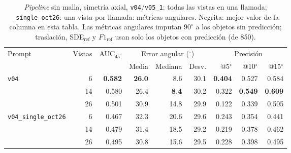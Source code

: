 
\begin{table}[htbp]
\centering
\caption{\textit{Pipeline} sin malla, simetría axial, \texttt{v04}/\texttt{v05\_1}: todas las vistas en una llamada; \texttt{\_single\_oct26}: una vista por llamada: métricas angulares. Negrita: mejor valor de la columna en esta tabla. Las métricas angulares imputan $90^\circ$ a los objetos sin predicción; traslación, SDE$_{\mathrm{ref}}$ y $F1_{\mathrm{ref}}$ usan solo los objetos con predicción (de 850).}
\label{tab:axis_modo_envio_angular}
\begin{adjustbox}{max width=\textwidth}
\begin{tabular}{lrrrrrrrr}
\toprule
\multirow{2}{*}{Prompt} & \multirow{2}{*}{Vistas} & \multirow{2}{*}{AUC$_{45^\circ}$} & \multicolumn{3}{c}{Error angular ($^\circ$)} & \multicolumn{3}{c}{Precisión} \\
\cmidrule(lr){4-6} \cmidrule(lr){7-9}
 &  &  & Media & Mediana & Desv. & @5$^\circ$ & @10$^\circ$ & @15$^\circ$ \\
\midrule
\multirow{3}{*}{\texttt{v04}} & 6 & \textbf{0.582} & \textbf{26.0} & 8.6 & 30.1 & \textbf{0.404} & 0.527 & 0.584 \\
 & 14 & 0.580 & 26.4 & \textbf{8.4} & 30.2 & 0.322 & \textbf{0.549} & \textbf{0.609} \\
 & 26 & 0.501 & 30.9 & 14.8 & 29.9 & 0.122 & 0.339 & 0.505 \\
\midrule
\multirow{3}{*}{\texttt{v04\_single\_oct26}} & 6 & 0.467 & 32.3 & 20.6 & 29.6 & 0.243 & 0.354 & 0.441 \\
 & 14 & 0.479 & 31.4 & 18.5 & 29.2 & 0.219 & 0.378 & 0.462 \\
 & 26 & 0.495 & 30.8 & 15.6 & 29.5 & 0.228 & 0.398 & 0.495 \\
\bottomrule
\end{tabular}
\end{adjustbox}
\end{table}

